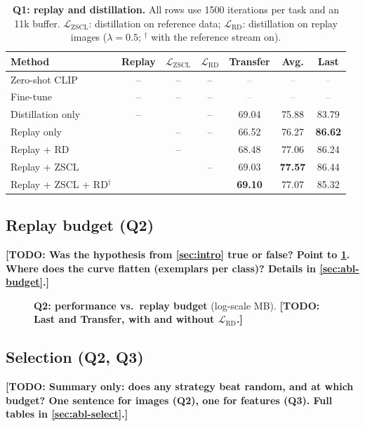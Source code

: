 \documentclass[10pt,twocolumn,letterpaper]{article}
\newcommand{\TODO}[1]{\textbf{\color{red}[TODO: #1]}}
\newcommand{\Q}[1]{\textbf{Q#1}\xspace}     %
\newcommand{\Lzscl}{\mathcal{L}_{\text{ZSCL}}}
\newcommand{\Lrd}{\mathcal{L}_{\text{RD}}}
\newcommand{\tbd}{\textcolor{gray}{--}}          %
\newcommand{\best}[1]{\textbf{#1}}
\newcommand{\cmark}{\checkmark}
\newcommand{\xmark}{--}
\begin{document}
\begin{table}[t]
\centering
\small
\setlength{\tabcolsep}{4pt}
\caption{\textbf{\Q{1}: replay and distillation.} All rows use 1500
iterations per task and an 11k buffer. $\Lzscl$: distillation on reference
data; $\Lrd$: distillation on replay images ($\lambda{=}0.5$; $^\dagger$ with
the reference stream on).}
\label{tab:q1}
\begin{tabular}{@{}l ccc ccc@{}}
\toprule
Method & Replay & $\Lzscl$ & $\Lrd$ & Transfer & Avg. & Last \\
\midrule
Zero-shot CLIP      & \xmark & \xmark & \xmark & \tbd & \tbd & \tbd \\
Fine-tune           & \xmark & \xmark & \xmark & \tbd & \tbd & \tbd \\
\midrule
Distillation only   & \xmark & \cmark & \xmark & 69.04 & 75.88 & 83.79 \\
Replay only         & \cmark & \xmark & \xmark & 66.52 & 76.27 & \best{86.62} \\
Replay + RD         & \cmark & \xmark & \cmark & 68.48 & 77.06 & 86.24 \\
Replay + ZSCL       & \cmark & \cmark & \xmark & 69.03 & \best{77.57} & 86.44 \\
Replay + ZSCL + RD$^\dagger$ & \cmark & \cmark & \cmark & \best{69.10} & 77.07 & 85.32 \\
\bottomrule
\end{tabular}
\end{table}

\subsection{Replay budget (\Q{2})}
\label{sec:res-q2a}
\TODO{Was the hypothesis from \cref{sec:intro} true or false? Point to \cref{fig:q2a}. Where does the curve flatten (exemplars per class)? Details in \cref{sec:abl-budget}.}

\begin{figure}[t]
  \centering
  \fbox{\rule{0pt}{1.2in}\rule{0.9\linewidth}{0pt}}
  \caption{\textbf{\Q{2}: performance vs.\ replay budget} (log-scale MB). \TODO{Last and Transfer, with and without $\Lrd$.}}
  \label{fig:q2a}
\end{figure}

\subsection{Selection (\Q{2}, \Q{3})}
\label{sec:res-select}
\TODO{Summary only: does any strategy beat random, and at which budget? One sentence for images (\Q{2}), one for features (\Q{3}). Full tables in \cref{sec:abl-select}.}
\end{document}
